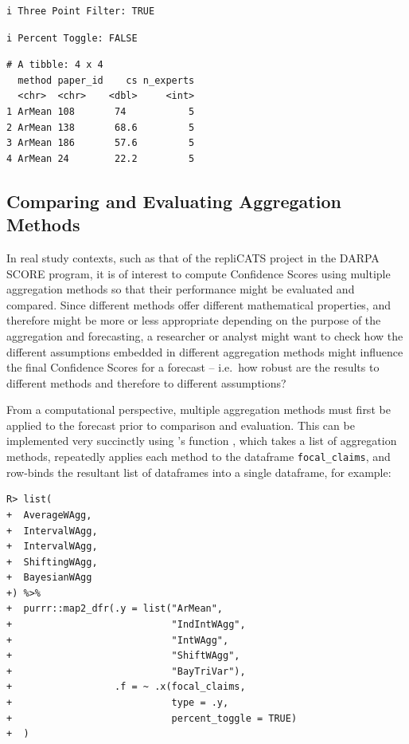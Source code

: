 \documentclass[article]{jss}
\newcommand{\fct}[1]{\code{#1()}}
\begin{document}
\begin{verbatim}
i Three Point Filter: TRUE
\end{verbatim}

\begin{verbatim}
i Percent Toggle: FALSE
\end{verbatim}

\begin{verbatim}
# A tibble: 4 x 4
  method paper_id    cs n_experts
  <chr>  <chr>    <dbl>     <int>
1 ArMean 108       74           5
2 ArMean 138       68.6         5
3 ArMean 186       57.6         5
4 ArMean 24        22.2         5
\end{verbatim}

\hypertarget{comparing-and-evaluating-aggregation-methods}{%
\subsection{Comparing and Evaluating Aggregation
Methods}\label{comparing-and-evaluating-aggregation-methods}}

In real study contexts, such as that of the repliCATS project in the
DARPA SCORE program, it is of interest to compute Confidence Scores
using multiple aggregation methods so that their performance might be
evaluated and compared. Since different methods offer different
mathematical properties, and therefore might be more or less appropriate
depending on the purpose of the aggregation and forecasting, a
researcher or analyst might want to check how the different assumptions
embedded in different aggregation methods might influence the final
Confidence Scores for a forecast -- i.e.~how robust are the results to
different methods and therefore to different assumptions?

From a computational perspective, multiple aggregation methods must
first be applied to the forecast prior to comparison and evaluation.
This can be implemented very succinctly using 's
\fct{map\_dfr} function \citep{purrr2020} , which takes a list of
aggregation methods, repeatedly applies each method to the dataframe
\texttt{focal\_claims}, and row-binds the resultant list of dataframes
into a single dataframe, for example:

\begin{verbatim}
R> list(
+  AverageWAgg,
+  IntervalWAgg,
+  IntervalWAgg,
+  ShiftingWAgg,
+  BayesianWAgg
+) %>%
+  purrr::map2_dfr(.y = list("ArMean", 
+                            "IndIntWAgg", 
+                            "IntWAgg", 
+                            "ShiftWAgg", 
+                            "BayTriVar"),
+                  .f = ~ .x(focal_claims, 
+                            type = .y, 
+                            percent_toggle = TRUE)
+  )
\end{verbatim}
\end{document}
